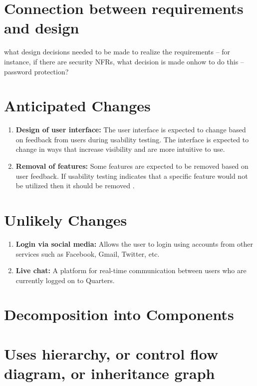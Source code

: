 \documentclass[12pt]{article}
\begin{document}
\section{Connection between requirements and design}
what design decisions needed to be made to realize the requirements – for instance, if there are security NFRs, what decision is made onhow to do this – password protection?

\section{Anticipated Changes}
\begin{enumerate}
  \item \textbf{Design of user interface:} The user interface is expected to change based on feedback from users during usability testing. The interface is expected to change in ways that increase visibility and are more intuitive to use.
  \item \textbf{Removal of features:} Some features are expected to be removed based on user feedback. If usability testing indicates that a specific feature would not be utilized then it should be removed .
\end{enumerate}

\section{Unlikely Changes}
\begin{enumerate}
  \item \textbf{Login via social media:} Allows the user to login using accounts from other services such as Facebook, Gmail, Twitter, etc.
  \item \textbf{Live chat:} A platform for real-time communication between users who are currently logged on to Quarters.
\end{enumerate}

%
\section{Decomposition into Components}

%
\section{Uses hierarchy, or control flow diagram, or inheritance graph}

\end{document}
